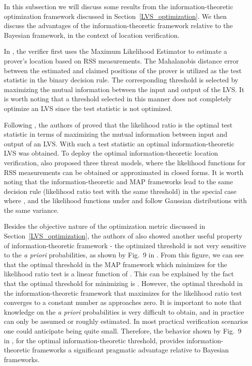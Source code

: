 \documentclass[journal]{IEEEtran}
\begin{document}
In this subsection we will discuss some results from the information-theoretic optimization framework  \cite{yan2012information,yan2012optimal} discussed in Section~\ref{LVS_optimization}. We then discuss the advantages of the information-theoretic framework relative to the Bayesian framework, in the context of location verification.


In \cite{yan2012information}, the verifier first uses the Maximum Likelihood Estimator to estimate a prover's location based on RSS measurements. The Mahalanobis distance error between the estimated and claimed positions of the prover is utilized as the test statistic in the binary decision rule. The corresponding threshold is selected by maximizing the
mutual information between the input and output of the LVS. It is worth noting that a threshold selected in this manner does not completely optimize an LVS since the test statistic is not optimized.



Following \cite{yan2012information}, the authors of \cite{yan2012optimal} proved that the likelihood ratio is the optimal test statistic in terms of maximizing the mutual information between input and output of an LVS. With such a test statistic an optimal information-theoretic LVS was obtained. To deploy the optimal information-theoretic location verification, \cite{yan2012optimal} also proposed three threat models, where the likelihood functions for RSS measurements can be obtained or approximated in closed forms. It is worth noting that the information-theoretic and MAP frameworks lead to the same decision rule (likelihood ratio test with the same threshold) in the special case where , and the likelihood functions under  and  follow Gaussian distributions with the same variance.

Besides the objective nature of the optimization metric discussed in Section~\ref{LVS_optimization}, the authors of \cite{yan2012optimal} also showed another useful property of information-theoretic framework - the optimized threshold is not very sensitive to the \emph{a priori} probabilities, as shown by Fig.~9 in \cite{yan2012optimal}. From this figure, we can see that the optimal threshold in the MAP framework which minimizes  for the likelihood ratio test is a linear function of . This can be explained by the fact that the optimal threshold for minimizing  is  \cite{barkat2005signal}. However, the optimal threshold in the information-theoretic framework that maximizes  for the likelihood ratio test converges to a constant number as  approaches zero. It is important to note that  knowledge on the \emph{a priori} probabilities is very difficult to obtain, and in practice can only be assumed or roughly estimated. In most practical verification scenarios one could anticipate  being quite small.
Therefore, the behavior shown by Fig.~9 in \cite{yan2012optimal}, for the optimal information-theoretic threshold, provides information-theoretic frameworks a significant pragmatic advantage relative to Bayesian frameworks.
\end{document}

